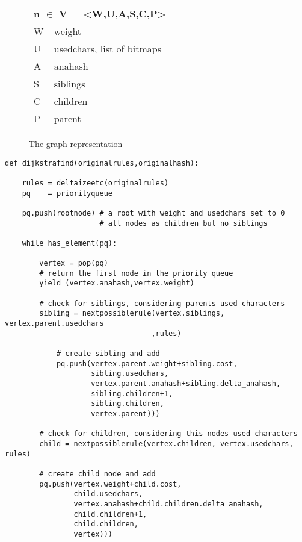 \documentclass[10pt,a5paper,twoside]{article}
\begin{document}
\begin{figure}
\begin{small}
\begin{tabular}{ll}
\multicolumn{2}{l}{\textbf{n $\in$ V = <W,U,A,S,C,P>}}\\
W   &   weight \\
U   &   usedchars, list of bitmaps \\
A  &    anahash \\
S   &   siblings \\
C   &   children \\
P   &   parent \\
\end{tabular}
\caption{The graph representation} 
\end{small}
\end{figure}


\begin{small}
\begin{verbatim}
def dijkstrafind(originalrules,originalhash):

    rules = deltaizeetc(originalrules)
    pq    = priorityqueue

    pq.push(rootnode) # a root with weight and usedchars set to 0 
                      # all nodes as children but no siblings

    while has_element(pq):

        vertex = pop(pq)
        # return the first node in the priority queue
        yield (vertex.anahash,vertex.weight)

        # check for siblings, considering parents used characters
        sibling = nextpossiblerule(vertex.siblings, vertex.parent.usedchars
                                  ,rules)
        
            # create sibling and add
            pq.push(vertex.parent.weight+sibling.cost,
                    sibling.usedchars,
                    vertex.parent.anahash+sibling.delta_anahash,
                    sibling.children+1,
                    sibling.children,
                    vertex.parent)))
 
        # check for children, considering this nodes used characters
        child = nextpossiblerule(vertex.children, vertex.usedchars, rules)
                   
        # create child node and add
        pq.push(vertex.weight+child.cost,
                child.usedchars,
                vertex.anahash+child.children.delta_anahash,
                child.children+1,
                child.children,
                vertex)))
        
\end{verbatim}\end{small}
\end{document}
